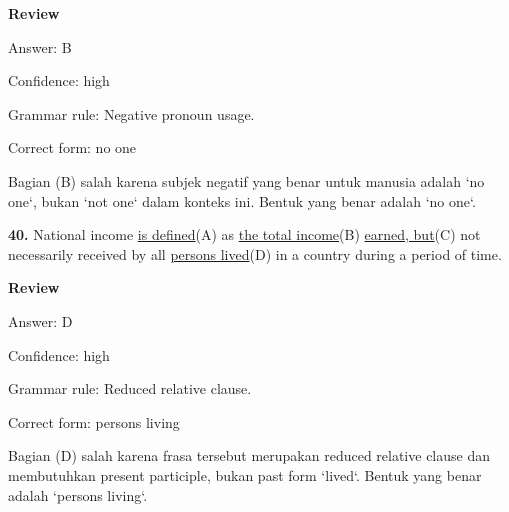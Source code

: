 \documentclass[12pt]{article}
\begin{document}
\par
\begingroup
\setlength{\parskip}{0pt}
\setlength{\parindent}{0pt}
\textbf{Review}\par
Answer: B\par
Confidence: high\par
Grammar rule: Negative pronoun usage.\par
Correct form: no one\par
Bagian (B) salah karena subjek negatif yang benar untuk manusia adalah `no one`, bukan `not one` dalam konteks ini. Bentuk yang benar adalah `no one`.\par
\endgroup
\par
\vspace{\questionblockgap}
\noindent\textbf{40.} National income \uline{is defined}(A) as \uline{the total income}(B) \uline{earned, but}(C) not necessarily received by all \uline{persons lived}(D) in a country during a period of time.
\par
\begingroup
\setlength{\parskip}{0pt}
\setlength{\parindent}{0pt}
\textbf{Review}\par
Answer: D\par
Confidence: high\par
Grammar rule: Reduced relative clause.\par
Correct form: persons living\par
Bagian (D) salah karena frasa tersebut merupakan reduced relative clause dan membutuhkan present participle, bukan past form `lived`. Bentuk yang benar adalah `persons living`.\par
\endgroup
\par
\vspace{\questionblockgap}
\end{document}
